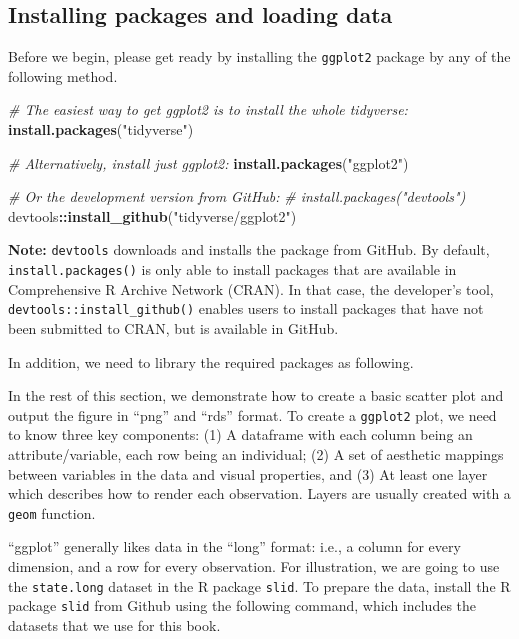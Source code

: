 \documentclass[]{book}
\newenvironment{Shaded}{\begin{snugshade}}{\end{snugshade}}
\newcommand{\KeywordTok}[1]{\textcolor[rgb]{0.13,0.29,0.53}{\textbf{#1}}}
\newcommand{\StringTok}[1]{\textcolor[rgb]{0.31,0.60,0.02}{#1}}
\newcommand{\CommentTok}[1]{\textcolor[rgb]{0.56,0.35,0.01}{\textit{#1}}}
\newcommand{\OperatorTok}[1]{\textcolor[rgb]{0.81,0.36,0.00}{\textbf{#1}}}
\newcommand{\NormalTok}[1]{#1}
\begin{document}
\subsection{Installing packages and loading
data}\label{installing-packages-and-loading-data}

Before we begin, please get ready by installing the \texttt{ggplot2}
package by any of the following method.

\begin{Shaded}
\begin{Highlighting}[]
\CommentTok{# The easiest way to get ggplot2 is to install the whole tidyverse:}
\KeywordTok{install.packages}\NormalTok{(}\StringTok{"tidyverse"}\NormalTok{)}

\CommentTok{# Alternatively, install just ggplot2:}
\KeywordTok{install.packages}\NormalTok{(}\StringTok{"ggplot2"}\NormalTok{)}

\CommentTok{# Or the development version from GitHub:}
\CommentTok{# install.packages("devtools")}
\NormalTok{devtools}\OperatorTok{::}\KeywordTok{install_github}\NormalTok{(}\StringTok{"tidyverse/ggplot2"}\NormalTok{)}
\end{Highlighting}
\end{Shaded}

\textbf{Note:} \texttt{devtools} downloads and installs the package from
GitHub. By default, \texttt{install.packages()} is only able to install
packages that are available in Comprehensive R Archive Network (CRAN).
In that case, the developer's tool, \texttt{devtools::install\_github()}
enables users to install packages that have not been submitted to CRAN,
but is available in GitHub.

In addition, we need to library the required packages as following.

In the rest of this section, we demonstrate how to create a basic
scatter plot and output the figure in ``png'' and ``rds'' format. To
create a \texttt{ggplot2} plot, we need to know three key components:
(1) A dataframe with each column being an attribute/variable, each row
being an individual; (2) A set of aesthetic mappings between variables
in the data and visual properties, and (3) At least one layer which
describes how to render each observation. Layers are usually created
with a \texttt{geom} function.

``ggplot'' generally likes data in the ``long'' format: i.e., a column
for every dimension, and a row for every observation. For illustration,
we are going to use the \texttt{state.long} dataset in the R package
\texttt{slid}. To prepare the data, install the R package \texttt{slid}
from Github using the following command, which includes the datasets
that we use for this book.
\end{document}
